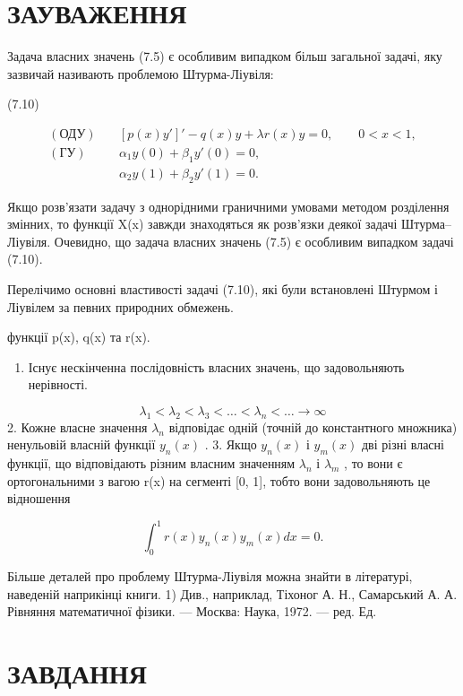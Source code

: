\documentclass[
  ukrainian,
]{article}
\providecommand{\tightlist}{%
  \setlength{\itemsep}{0pt}\setlength{\parskip}{0pt}}
\begin{document}
\section{ЗАУВАЖЕННЯ}\label{ux437ux430ux443ux432ux430ux436ux435ux43dux43dux44f-5}

Задача власних значень (7.5) є особливим випадком більш загальної
задачі, яку зазвичай називають проблемою Штурма-Ліувіля:

(7.10)

\[
\begin{aligned}
(\text{ОДУ})\quad & [p(x)y']' - q(x)y + \lambda r(x)y = 0,\qquad 0<x<1,\\
(\text{ГУ})\quad & \alpha_1 y(0) + \beta_1 y'(0)=0,\\
& \alpha_2 y(1) + \beta_2 y'(1)=0.
\end{aligned}
\]

Якщо розв'язати задачу з однорідними граничними умовами методом
розділення змінних, то функції X(x) завжди знаходяться як розв'язки
деякої задачі Штурма--Ліувіля. Очевидно, що задача власних значень (7.5)
є особливим випадком задачі (7.10).

Перелічимо основні властивості задачі (7.10), які були встановлені
Штурмом і Ліувілем за певних природних обмежень.

функції p(x), q(x) та r(x).

\begin{enumerate}
\def\labelenumi{\arabic{enumi}.}
\tightlist
\item
  Існує нескінченна послідовність власних значень, що задовольняють
  нерівності.
\end{enumerate}

\[
\lambda_1 < \lambda_2 < \lambda_3 < \ldots < \lambda_n < \ldots \to \infty
\] 2. Кожне власне значення \(\lambda_n\) відповідає одній (точній до
константного множника) ненульовій власній функції \(y_n(x)\) . 3. Якщо
\(y_n(x)\) і \(y_m(x)\) дві різні власні функції, що відповідають різним
власним значенням \(\lambda_n\) і \(\lambda_m\) , то вони є
ортогональними з вагою r(x) на сегменті {[}0, 1{]}, тобто вони
задовольняють це відношення

\[
\int_{0}^{1} r(x) y_{n}(x) y_{m}(x) dx = 0.
\]

Більше деталей про проблему Штурма-Ліувіля можна знайти в літературі,
наведеній наприкінці книги. 1) Див., наприклад, Тіхоног А. Н.,
Самарський А. А. Рівняння математичної фізики. --- Москва: Наука, 1972.
--- ред. Ед.

\section{ЗАВДАННЯ}\label{ux437ux430ux432ux434ux430ux43dux43dux44f-6}
\end{document}
